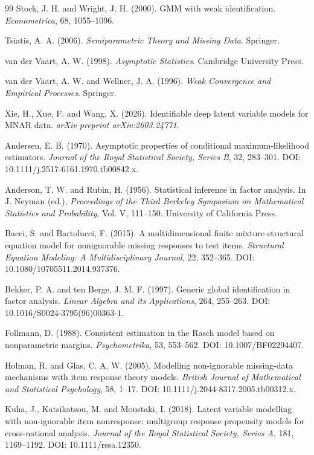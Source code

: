 \documentclass[11pt,a4paper]{ltjsarticle}
\theoremstyle{remark}
\begin{document}
\begin{thebibliography}{99}
Stock, J. H. and Wright, J. H. (2000).
GMM with weak identification.
\emph{Econometrica}, 68, 1055--1096.

Tsiatis, A. A. (2006).
\emph{Semiparametric Theory and Missing Data}.
Springer.

van der Vaart, A. W. (1998).
\emph{Asymptotic Statistics}.
Cambridge University Press.

van der Vaart, A. W. and Wellner, J. A. (1996).
\emph{Weak Convergence and Empirical Processes}.
Springer.

Xie, H., Xue, F. and Wang, X. (2026).
Identifiable deep latent variable models for MNAR data.
\emph{arXiv preprint arXiv:2603.24771}.



Andersen, E. B. (1970).
Asymptotic properties of conditional maximum-likelihood estimators.
\emph{Journal of the Royal Statistical Society, Series B}, 32, 283--301.
DOI: 10.1111/j.2517-6161.1970.tb00842.x.

Anderson, T. W. and Rubin, H. (1956).
Statistical inference in factor analysis.
In J. Neyman (ed.), \emph{Proceedings of the Third Berkeley Symposium on Mathematical Statistics and Probability}, Vol. V, 111--150.
University of California Press.

Bacci, S. and Bartolucci, F. (2015).
A multidimensional finite mixture structural equation model for nonignorable missing responses to test items.
\emph{Structural Equation Modeling: A Multidisciplinary Journal}, 22, 352--365.
DOI: 10.1080/10705511.2014.937376.

Bekker, P. A. and ten Berge, J. M. F. (1997).
Generic global identification in factor analysis.
\emph{Linear Algebra and its Applications}, 264, 255--263.
DOI: 10.1016/S0024-3795(96)00363-1.

Follmann, D. (1988).
Consistent estimation in the Rasch model based on nonparametric margins.
\emph{Psychometrika}, 53, 553--562.
DOI: 10.1007/BF02294407.

Holman, R. and Glas, C. A. W. (2005).
Modelling non-ignorable missing-data mechanisms with item response theory models.
\emph{British Journal of Mathematical and Statistical Psychology}, 58, 1--17.
DOI: 10.1111/j.2044-8317.2005.tb00312.x.

Kuha, J., Katsikatsou, M. and Moustaki, I. (2018).
Latent variable modelling with non-ignorable item nonresponse: multigroup response propensity models for cross-national analysis.
\emph{Journal of the Royal Statistical Society, Series A}, 181, 1169--1192.
DOI: 10.1111/rssa.12350.


\end{thebibliography}
\end{document}
